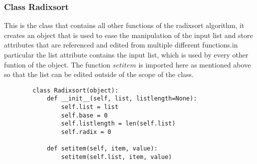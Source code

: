 \documentclass[12pt]{article}
\begin{document}
\subsubsection{Class Radixsort}
This is the class that contains all other functions of the radixsort algorithm, it creates an object that is used to ease the manipulation of the input list and store attributes that are referenced and edited from multiple different functions.\newline in particular the list attribute contains the input list, which is used by every other funtion of the object.
\newline
The function $setitem$ is imported here as mentioned above so that the list can be edited outside of the scope of the class.
\begin{lstlisting}
        class Radixsort(object):
            def __init__(self, list, listlength=None):
                self.list = list
                self.base = 0
                self.listlength = len(self.list)
                self.radix = 0
    
            def setitem(self, item, value):
                setitem(self.list, item, value)
      \end{lstlisting}
\end{document}
